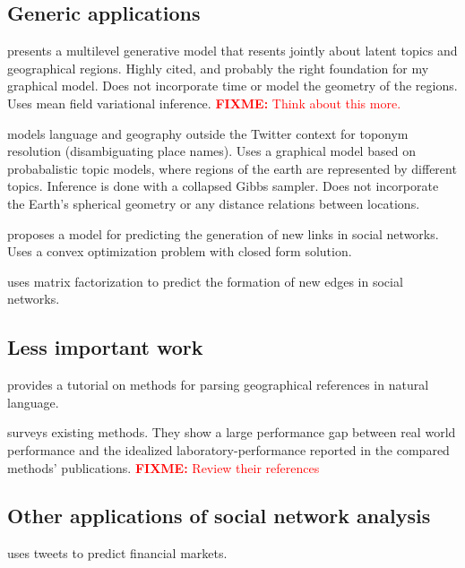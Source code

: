 \documentclass{article}
\newcommand{\fixme}[1]{\textcolor{red}{\textbf{FIXME:} {#1}}}
\begin{document}
\subsection{Generic applications}

\citet{eisenstein2010latent} presents a multilevel generative model that resents jointly about latent topics and geographical regions.
Highly cited, and probably the right foundation for my graphical model.
Does not incorporate time or model the geometry of the regions.
Uses mean field variational inference.
\fixme{Think about this more.}

\citet{speriosu2010connecting} models language and geography outside the Twitter context for toponym resolution (disambiguating place names).
Uses a graphical model based on probabalistic topic models,
where regions of the earth are represented by different topics.
Inference is done with a collapsed Gibbs sampler.
Does not incorporate the Earth's spherical geometry or any distance relations between locations.

\citet{wu2017link} proposes a model for predicting the generation of new links in social networks. 
Uses a convex optimization problem with closed form solution.

\citet{yu2017temporally} uses matrix factorization to predict the formation of new edges in social networks.


\subsection{Less important work}

\citet{leidner2011detecting} provides a tutorial on methods for parsing geographical references in natural language.

\citet{jurgens2015geolocation} surveys existing methods.
They show a large performance gap between real world performance and the idealized laboratory-performance reported in the compared methods' publications.
\fixme{Review their references}


\subsection{Other applications of social network analysis}

\citet{ruiz2012correlating} uses tweets to predict financial markets.
\end{document}
